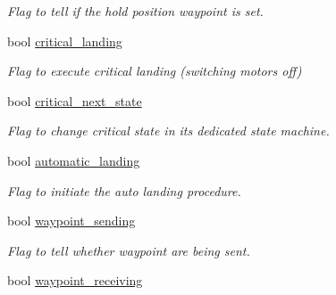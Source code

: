 \begin{DoxyCompactItemize}
\begin{DoxyCompactList}\small\item\em Flag to tell if the hold position waypoint is set. \end{DoxyCompactList}\item 
\hypertarget{structmavlink__waypoint__handler__t_a70fa9d585eae1149d96bf298eaab3375}{bool \hyperlink{structmavlink__waypoint__handler__t_a70fa9d585eae1149d96bf298eaab3375}{critical\+\_\+landing}}\label{structmavlink__waypoint__handler__t_a70fa9d585eae1149d96bf298eaab3375}

\begin{DoxyCompactList}\small\item\em Flag to execute critical landing (switching motors off) \end{DoxyCompactList}\item 
\hypertarget{structmavlink__waypoint__handler__t_a703868b5a6dd0476e31449fbe64417eb}{bool \hyperlink{structmavlink__waypoint__handler__t_a703868b5a6dd0476e31449fbe64417eb}{critical\+\_\+next\+\_\+state}}\label{structmavlink__waypoint__handler__t_a703868b5a6dd0476e31449fbe64417eb}

\begin{DoxyCompactList}\small\item\em Flag to change critical state in its dedicated state machine. \end{DoxyCompactList}\item 
\hypertarget{structmavlink__waypoint__handler__t_a11a6b2d7c7e19e9a886f14d3ef179e3d}{bool \hyperlink{structmavlink__waypoint__handler__t_a11a6b2d7c7e19e9a886f14d3ef179e3d}{automatic\+\_\+landing}}\label{structmavlink__waypoint__handler__t_a11a6b2d7c7e19e9a886f14d3ef179e3d}

\begin{DoxyCompactList}\small\item\em Flag to initiate the auto landing procedure. \end{DoxyCompactList}\item 
\hypertarget{structmavlink__waypoint__handler__t_a6bc2dc1045f232fe849e47039f14bb63}{bool \hyperlink{structmavlink__waypoint__handler__t_a6bc2dc1045f232fe849e47039f14bb63}{waypoint\+\_\+sending}}\label{structmavlink__waypoint__handler__t_a6bc2dc1045f232fe849e47039f14bb63}

\begin{DoxyCompactList}\small\item\em Flag to tell whether waypoint are being sent. \end{DoxyCompactList}\item 
\hypertarget{structmavlink__waypoint__handler__t_a98d90b203194ff81839eccde4446c859}{bool \hyperlink{structmavlink__waypoint__handler__t_a98d90b203194ff81839eccde4446c859}{waypoint\+\_\+receiving}}\label{structmavlink__waypoint__handler__t_a98d90b203194ff81839eccde4446c859}


\end{DoxyCompactItemize}
